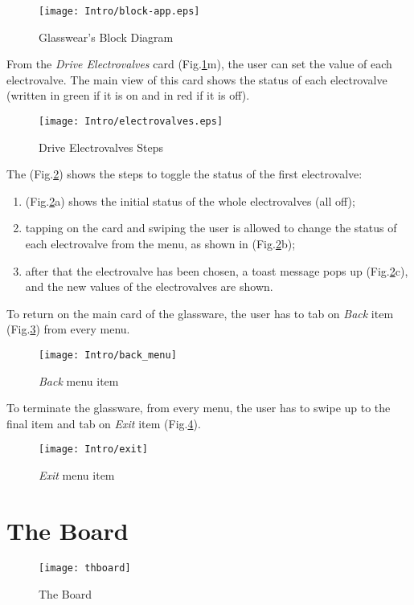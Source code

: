  \begin{figure}[h]
 	\centering
	\texttt{[image: Intro/block-app.eps]}
 	\caption{Glasswear's Block Diagram}
 	\label{Fig:GlasswearDiagram}
 \end{figure}

 
 From the \textit{Drive Electrovalves} card (Fig.\ref{Fig:GlasswearDiagram}m), the user can set the value of each electrovalve. The main view of this card shows the status of each electrovalve (written in green if it is on and in red if it is off).
 \clearpage
 \begin{figure}[h]
 	\centering
 	\texttt{[image: Intro/electrovalves.eps]}
 	\caption{Drive Electrovalves Steps}
 	\label{Fig:Electrovalves}
 \end{figure}
 
 The (Fig.\ref{Fig:Electrovalves}) shows the steps to toggle the status of the first electrovalve:
 \begin{enumerate}
 	\item (Fig.\ref{Fig:Electrovalves}a) shows the initial status of the whole electrovalves (all off);
 	\item tapping on the card and swiping the user is allowed to change the status of each electrovalve from the menu, as shown in (Fig.\ref{Fig:Electrovalves}b);
 	\item after that the electrovalve has been chosen, a toast message pops up (Fig.\ref{Fig:Electrovalves}c), and the new values of the electrovalves are shown. 
 \end{enumerate}
 
 To return on the main card of the glassware, the user has to tab on \textit{Back} item (Fig.\ref{Fig:Back}) from every menu.
 
 \begin{figure}[h]
 	\centering
 	\texttt{[image: Intro/back\_menu]}
 	\caption{\textit{Back} menu item}
 	\label{Fig:Back}
 \end{figure}
 
 To terminate the glassware, from every menu, the user has to swipe up to the final item and tab on \textit{Exit} item (Fig.\ref{Fig:Exit}).
 
 \begin{figure}[h]
 	\centering
 	\texttt{[image: Intro/exit]}
 	\caption{\textit{Exit} menu item}
 	\label{Fig:Exit}
 \end{figure}
 
\section*{The Board}
\begin{figure}[h]
	\begin{center}
		\texttt{[image: thboard]}
		\caption{The Board}
		\label{Fig:board}
	\end{center}
\end{figure}

